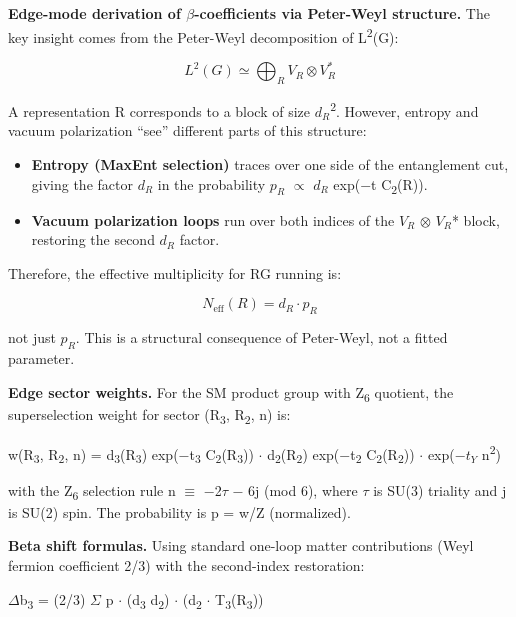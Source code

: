 \documentclass[11pt,a4paper]{article}
\theoremstyle{remark}
\begin{document}
\textbf{Edge-mode derivation of \ensuremath{\beta}-coefficients via Peter-Weyl structure.} The key insight comes from the Peter-Weyl decomposition of L\textsuperscript{2}(G):

\[
L^2(G) \simeq \bigoplus_R V_R \otimes V_R^*
\]

A representation R corresponds to a block of size \(d_R\)\textsuperscript{2}. However, entropy and vacuum polarization ``see'' different parts of this structure:

\begin{itemize}
\item
  \textbf{Entropy (MaxEnt selection)} traces over one side of the entanglement cut, giving the factor \(d_R\) in the probability \(p_R\) \ensuremath{\propto} \(d_R\) exp(\ensuremath{-}t C\textsubscript{2}(R)).
\item
  \textbf{Vacuum polarization loops} run over both indices of the \(V_R\) \ensuremath{\otimes} \(V_R\)* block, restoring the second \(d_R\) factor.
\end{itemize}

Therefore, the effective multiplicity for RG running is:

\[
N_{\text{eff}}(R) = d_R \cdot p_R
\]

not just \(p_R\). This is a structural consequence of Peter-Weyl, not a fitted parameter.

\textbf{Edge sector weights.} For the SM product group with Z\textsubscript{6} quotient, the superselection weight for sector (R\textsubscript{3}, R\textsubscript{2}, n) is:

w(R\textsubscript{3}, R\textsubscript{2}, n) = d\textsubscript{3}(R\textsubscript{3}) exp(\ensuremath{-}t\textsubscript{3} C\textsubscript{2}(R\textsubscript{3})) \ensuremath{\cdot} d\textsubscript{2}(R\textsubscript{2}) exp(\ensuremath{-}t\textsubscript{2} C\textsubscript{2}(R\textsubscript{2})) \ensuremath{\cdot} exp(\ensuremath{-}\(t_Y\) n\textsuperscript{2})

with the Z\textsubscript{6} selection rule n \ensuremath{\equiv} \ensuremath{-}2\ensuremath{\tau} \ensuremath{-} 6j (mod 6), where \ensuremath{\tau} is SU(3) triality and j is SU(2) spin. The probability is p = w/Z (normalized).

\textbf{Beta shift formulas.} Using standard one-loop matter contributions (Weyl fermion coefficient 2/3) with the second-index restoration:

\ensuremath{\Delta}b\textsubscript{3} = (2/3) \ensuremath{\Sigma} p \ensuremath{\cdot} (d\textsubscript{3} d\textsubscript{2}) \ensuremath{\cdot} (d\textsubscript{2} \ensuremath{\cdot} T\textsubscript{3}(R\textsubscript{3}))
\end{document}
